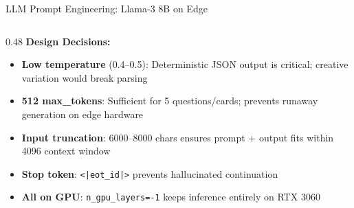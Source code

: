 \documentclass[aspectratio=169,10pt]{beamer}
\begin{document}
\begin{frame}{LLM Prompt Engineering: Llama-3 8B on Edge}
\begin{columns}[T]
\begin{column}{0.48\textwidth}
\vspace{6pt}
\textbf{Design Decisions:}
\begin{itemize}\scriptsize
  \item \textbf{Low temperature} (0.4--0.5): Deterministic JSON output is critical; creative variation would break parsing
  \item \textbf{512 max\_tokens}: Sufficient for 5 questions/cards; prevents runaway generation on edge hardware
  \item \textbf{Input truncation}: 6000--8000 chars ensures prompt + output fits within 4096 context window
  \item \textbf{Stop token}: \texttt{<|eot\_id|>} prevents hallucinated continuation
  \item \textbf{All on GPU}: \texttt{n\_gpu\_layers=-1} keeps inference entirely on RTX 3060
\end{itemize}
\end{column}
\end{columns}
\end{frame}
\end{document}
